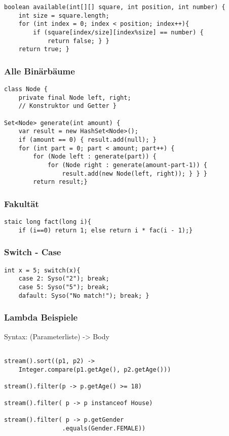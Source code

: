 \begin{multicols*}{5}
\begin{lstlisting}
boolean available(int[][] square, int position, int number) {
	int size = square.length;
	for (int index = 0; index < position; index++){
		if (square[index/size][index%size] == number) {
			return false; } }
	return true; }
		\end{lstlisting}
	
	\subsubsection{Alle Binärbäume}
	\begin{lstlisting}
class Node {
	private final Node left, right; 
	// Konstruktor und Getter }

Set<Node> generate(int amount) {
	var result = new HashSet<Node>(); 
	if (amount == 0) { result.add(null); }
	for (int part = 0; part < amount; part++) {
		for (Node left : generate(part)) {
			for (Node right : generate(amount-part-1)) {
				result.add(new Node(left, right)); } } }
		return result;}
	\end{lstlisting}
	\subsubsection{Fakultät}
		\begin{lstlisting}
staic long fact(long i){
	if (i==0) return 1; else return i * fac(i - 1);}
		\end{lstlisting}

	\subsubsection{Switch - Case}
		\begin{lstlisting}
int x = 5; switch(x){
	case 2: Syso("2"); break;
	case 5: Syso("5"); break;
	dafault: Syso("No match!"); break; }
		\end{lstlisting}
	\subsubsection{Lambda Beispiele}
	Syntax: (Parameterliste) -> {Body}
	\begin{lstlisting}

stream().sort((p1, p2) -> 
	Integer.compare(p1.getAge(), p2.getAge()))

stream().filter(p -> p.getAge() >= 18)

stream().filter( p -> p instanceof House)

stream().filter( p -> p.getGender
				.equals(Gender.FEMALE))


\end{lstlisting}
\end{multicols*}
